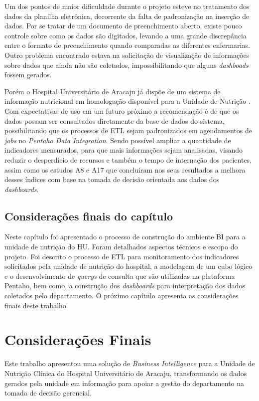Um dos pontos de maior dificuldade durante o projeto esteve no tratamento dos dados da planilha eletrônica, decorrente da falta de padronização na inserção de dados. Por se tratar de um documento de preenchimento aberto, existe pouco controle sobre como os dados são digitados, levando a uma grande discrepância entre o formato de preenchimento quando comparadas as diferentes enfermarias. Outro problema encontrado estava na solicitação de visualização de informações sobre dados que ainda não são coletados, impossibilitando que alguns \textit{dashboads} fossem gerados.

Porém o Hospital Universitário de Aracaju já dispõe de um sistema de informação nutricional em homologação disponível para a Unidade de Nutrição \cite{crisnaldo2020}. Com expectativas de uso em um futuro próximo a recomendação é de que os dados possam ser consultados diretamente da base de dados do sistema, possibilitando que os processos de ETL sejam padronizados em agendamentos de \textit{jobs} no \textit{Pentaho Data Integration}. Sendo possível ampliar a quantidade de indicadores mensurados, para que mais informações sejam analisadas, visando reduzir o desperdício de recursos e também o tempo de internação dos pacientes, assim como os estudos A8 e A17 que concluíram nos seus resultados a melhora desses índices com base na tomada de decisão orientada aos dados dos \textit{dashboards}. 

\section{Considerações finais do capítulo}
Neste capítulo foi apresentado o processo de construção do ambiente BI para a unidade de nutrição do HU. Foram detalhados aspectos técnicos e escopo do projeto. Foi descrito o processo de ETL para monitoramento dos indicadores solicitados pela unidade de nutrição do hospital, a modelagem de um cubo lógico e o desenvolvimento de \textit{querys} de consulta que são utilizadas na plataforma Pentaho, bem como, a construção dos \textit{dashboards} para interpretação dos dados coletados pelo departamento. O próximo capítulo apresenta as considerações finais deste trabalho.


\chapter{Considerações Finais}
Este trabalho apresentou uma solução de \textit{Business Intelligence} para a Unidade de Nutrição Clínica do Hospital Universitário de Aracaju, transformando os dados gerados pela unidade em informação para apoiar a gestão do departamento na tomada de decisão gerencial.

